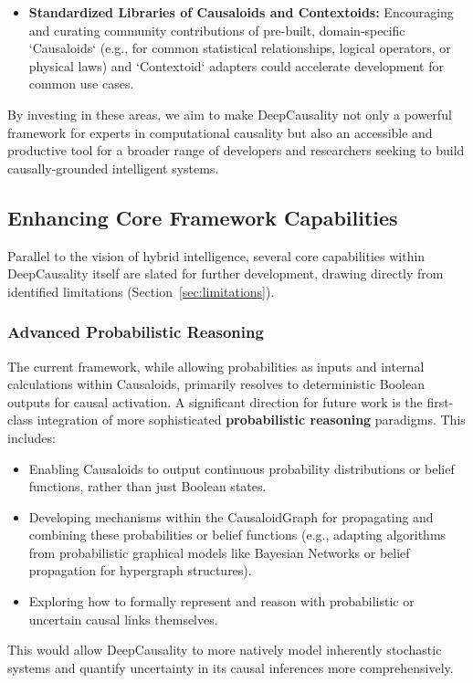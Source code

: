 \begin{itemize}
    \item \textbf{Standardized Libraries of Causaloids and Contextoids:} Encouraging and curating community contributions of pre-built, domain-specific `Causaloids` (e.g., for common statistical relationships, logical operators, or physical laws) and `Contextoid` adapters could accelerate development for common use cases.
\end{itemize}

By investing in these areas, we aim to make DeepCausality not only a powerful framework for experts in computational causality but also an accessible and productive tool for a broader range of developers and researchers seeking to build causally-grounded intelligent systems.

\subsection{Enhancing Core Framework Capabilities}

Parallel to the vision of hybrid intelligence, several core capabilities within DeepCausality itself are slated for further development, drawing directly from identified limitations (Section~\ref{sec:limitations}).

\subsubsection{Advanced Probabilistic Reasoning}
The current framework, while allowing probabilities as inputs and internal calculations within Causaloids, primarily resolves to deterministic Boolean outputs for causal activation. A significant direction for future work is the first-class integration of more sophisticated \textbf{probabilistic reasoning} paradigms. This includes:
\begin{itemize}
    \item Enabling Causaloids to output continuous probability distributions or belief functions, rather than just Boolean states.
    \item Developing mechanisms within the CausaloidGraph for propagating and combining these probabilities or belief functions (e.g., adapting algorithms from probabilistic graphical models like Bayesian Networks or belief propagation for hypergraph structures).
    \item Exploring how to formally represent and reason with probabilistic or uncertain causal links themselves.
\end{itemize}
This would allow DeepCausality to more natively model inherently stochastic systems and quantify uncertainty in its causal inferences more comprehensively.

